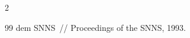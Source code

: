 \begin{multicols}{2}
{{\begin{thebibliography}{99}
dem SNNS~// Proceedings of the SNNS, 1993.

















 \end{thebibliography}


}


}





\end{multicols}


